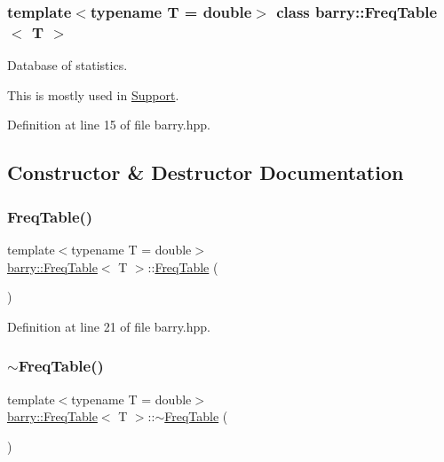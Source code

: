 \subsubsection*{template$<$typename T = double$>$\newline
class barry\+::\+Freq\+Table$<$ T $>$}

Database of statistics. 

This is mostly used in {\ttfamily \hyperlink{classbarry_1_1_support}{Support}}. 

Definition at line 15 of file barry.\+hpp.



\subsection{Constructor \& Destructor Documentation}
\mbox{\label{classbarry_1_1_freq_table_aea4b22f8097950c3d78e81ab2ed38ae1}} 
\subsubsection{\texorpdfstring{Freq\+Table()}{FreqTable()}}
{\footnotesize\ttfamily template$<$typename T  = double$>$ \\
\hyperlink{classbarry_1_1_freq_table}{barry\+::\+Freq\+Table}$<$ T $>$\+::\hyperlink{classbarry_1_1_freq_table}{Freq\+Table} (\begin{DoxyParamCaption}{ }\end{DoxyParamCaption})\hspace{0.3cm}{\ttfamily [inline]}}



Definition at line 21 of file barry.\+hpp.

\mbox{\label{classbarry_1_1_freq_table_a420a7e4e6740ed7f2b0db1a238f53713}} 
\subsubsection{\texorpdfstring{$\sim$\+Freq\+Table()}{~FreqTable()}}
{\footnotesize\ttfamily template$<$typename T  = double$>$ \\
\hyperlink{classbarry_1_1_freq_table}{barry\+::\+Freq\+Table}$<$ T $>$\+::$\sim$\hyperlink{classbarry_1_1_freq_table}{Freq\+Table} (\begin{DoxyParamCaption}{ }\end{DoxyParamCaption})\hspace{0.3cm}{\ttfamily [inline]}}



